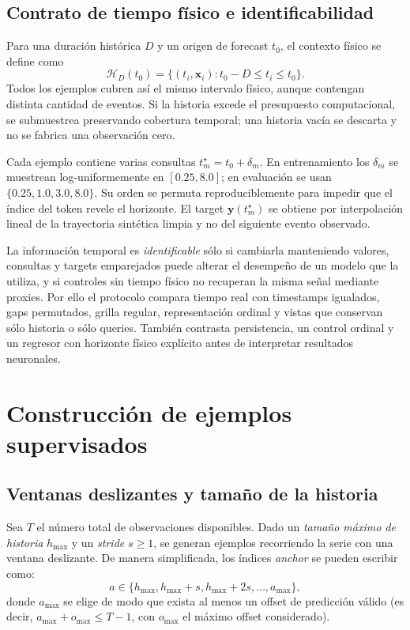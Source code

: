 \subsection{Contrato de tiempo físico e identificabilidad}

Para una duración histórica $D$ y un origen de forecast $t_0$, el contexto físico se define como
\begin{equation}
    \mathcal{H}_{D}(t_0)=\{(t_i,\mathbf{x}_i):t_0-D\leq t_i\leq t_0\}.
\end{equation}
Todos los ejemplos cubren así el mismo intervalo físico, aunque contengan distinta cantidad de eventos. Si la historia excede el presupuesto computacional, se submuestrea preservando cobertura temporal; una historia vacía se descarta y no se fabrica una observación cero.

Cada ejemplo contiene varias consultas $t_m^\star=t_0+\delta_m$. En entrenamiento los $\delta_m$ se muestrean log-uniformemente en $[0.25,8.0]$; en evaluación se usan $\{0.25,1.0,3.0,8.0\}$. Su orden se permuta reproduciblemente para impedir que el índice del token revele el horizonte. El target $\mathbf{y}(t_m^\star)$ se obtiene por interpolación lineal de la trayectoria sintética limpia y no del siguiente evento observado.

La información temporal es \emph{identificable} sólo si cambiarla manteniendo valores, consultas y targets emparejados puede alterar el desempeño de un modelo que la utiliza, y si controles sin tiempo físico no recuperan la misma señal mediante proxies. Por ello el protocolo compara tiempo real con timestamps igualados, gaps permutados, grilla regular, representación ordinal y vistas que conservan sólo historia o sólo queries. También contrasta persistencia, un control ordinal y un regresor con horizonte físico explícito antes de interpretar resultados neuronales.

\section{Construcción de ejemplos supervisados}

\subsection{Ventanas deslizantes y tamaño de la historia}

Sea $T$ el número total de observaciones disponibles. Dado un \textit{tamaño máximo de historia} $h_{\max}$ y un \textit{stride} $s \ge 1$, se generan ejemplos recorriendo la serie con una ventana deslizante. De manera simplificada, los índices \emph{anchor} se pueden escribir como:
\begin{equation}
    a \in \{h_{\max}, h_{\max}+s, h_{\max}+2s, \dots, a_{\max}\},
\end{equation}
donde $a_{\max}$ se elige de modo que exista al menos un offset de predicción válido (es decir, $a_{\max} + o_{\max} \le T-1$, con $o_{\max}$ el máximo offset considerado).

